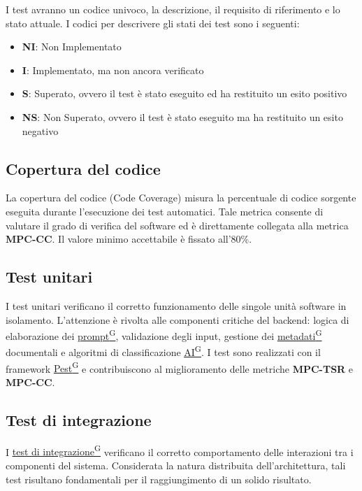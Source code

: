 \documentclass[a4paper,12pt]{article}
\providecommand{\glslink}[2]{\href{https://alittlebyte-19.github.io/Documentazione/glossario.html\#gls-#1}{\underline{#2}\textsuperscript{\scriptsize G}}}
\begin{document}
I test avranno un codice univoco, la descrizione, il requisito di riferimento e lo stato attuale. I codici per descrivere gli stati dei test sono i seguenti:
\begin{itemize}
    \item \textbf{NI}: Non Implementato
    \item \textbf{I}: Implementato, ma non ancora verificato
    \item \textbf{S}: Superato, ovvero il test è stato eseguito ed ha restituito un esito positivo
    \item \textbf{NS}: Non Superato, ovvero il test è stato eseguito ma ha restituito un esito negativo
\end{itemize}

\subsection{Copertura del codice}
La copertura del codice (Code Coverage) misura la percentuale di codice sorgente eseguita durante l'esecuzione dei test automatici. Tale metrica consente di valutare il grado di verifica del software ed è direttamente collegata alla metrica \textbf{MPC-CC}.
Il valore minimo accettabile è fissato all'80\%.

\subsection{Test unitari}
I test unitari verificano il corretto funzionamento delle singole unità software in isolamento. L'attenzione è rivolta alle componenti critiche del backend: logica di elaborazione dei \glslink{prompt}{prompt}, validazione degli input, gestione dei \glslink{metadati}{metadati} documentali e algoritmi di classificazione \glslink{intelligenza-artificiale-ai}{AI}. I test sono realizzati con il framework \glslink{pest}{Pest} e contribuiscono al miglioramento delle metriche \textbf{MPC-TSR} e \textbf{MPC-CC}.

\subsection{Test di integrazione}
I \glslink{test-di-integrazione}{test di integrazione} verificano il corretto comportamento delle interazioni tra i componenti del sistema. Considerata la natura distribuita dell'architettura, tali test risultano fondamentali per il raggiungimento di un solido risultato.
\end{document}
